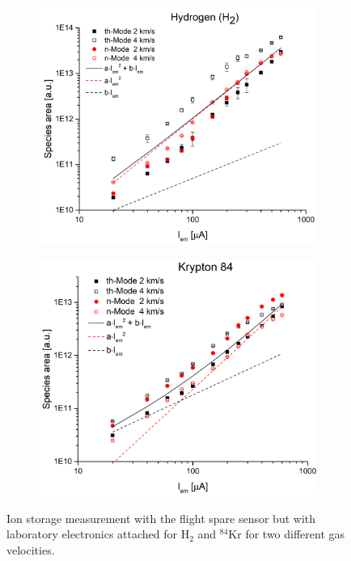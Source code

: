 		
		\begin{figure}[h] %
			\begin{subfigure}{0.5\textwidth}
				\centering
				\includegraphics[width = \textwidth]{Experiments/FSLabIonStorageH2.png}
			\end{subfigure}
			\begin{subfigure}{0.5\textwidth}
				\centering
				\includegraphics[width = \textwidth]{Experiments/FSLabIonStorageKr84.png}
			\end{subfigure}
			\caption{Ion storage measurement with the flight spare sensor but with laboratory electronics attached for H$_2$ and $^{84}$Kr for two different gas velocities.}
			\label{fig:ExpFSFlightSenIonStor}
		\end{figure}

